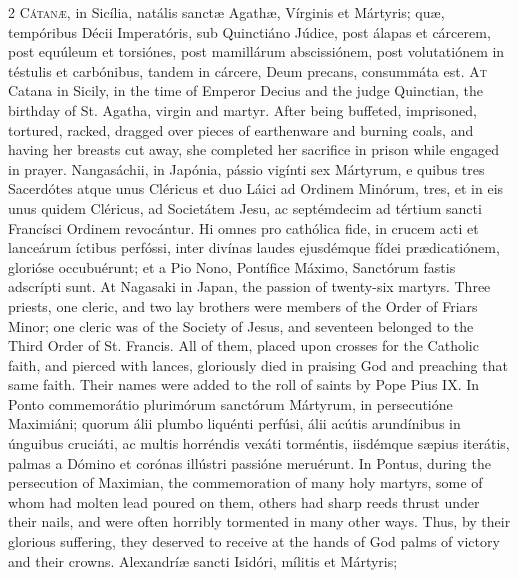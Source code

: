 \begin{paracol}{2}
\lettrine[lines=2]{C}{átanæ,} in Sicília, natális sanctæ Agathæ, 
 Vírginis et Mártyris; quæ, tempóribus Décii Imperatóris, sub Quinctiáno 
 Júdice, post álapas et cárcerem, post equúleum et torsiónes, post mamillárum 
 abscissiónem, post volutatiónem in téstulis et carbónibus, tandem in cárcere, 
 Deum precans, consummáta est.
\switchcolumn
{}
\lettrine[lines=2]{A}{t} Catana in Sicily, in the time of Emperor Decius and the judge Quinctian, 
 the birthday of St. Agatha, virgin and martyr. After being buffeted, 
 imprisoned, tortured, racked, dragged over pieces of earthenware and burning 
 coals, and having her breasts cut away, she completed her sacrifice in 
 prison while engaged in prayer.
\switchcolumn*
{}
Nangasáchii, in Japónia, pássio vigínti sex Mártyrum, e quibus tres 
 Sacerdótes atque unus Cléricus et duo Láici ad Ordinem Minórum, tres, et in 
 eis unus quidem Cléricus, ad Societátem Jesu, ac septémdecim ad tértium 
 sancti Francísci Ordinem revocántur. Hi omnes pro cathólica fide, in 
 crucem acti et lanceárum íctibus perfóssi, inter divínas laudes ejusdémque 
 fídei prædicatiónem, glorióse occubuérunt; et a 
 Pio Nono, Pontífice Máximo, Sanctórum fastis adscrípti sunt.
\switchcolumn
{}
At Nagasaki in Japan, the passion of twenty-six martyrs. Three 
 priests, one cleric, and two lay brothers were members of the Order of 
 Friars Minor; one cleric was of the Society of Jesus, and seventeen belonged 
 to the Third Order of St. Francis. All of them, placed upon crosses 
 for the Catholic faith, and pierced with lances, gloriously died in praising 
 God and preaching that same faith. Their names were added to the roll 
 of saints by Pope Pius IX.
\switchcolumn*
{}
In Ponto commemorátio plurimórum sanctórum Mártyrum, in persecutióne 
 Maximiáni; quorum álii plumbo liquénti perfúsi, álii acútis arundínibus in 
 únguibus cruciáti, ac multis horréndis vexáti torméntis, iisdémque sæpius 
 iterátis, palmas a Dómino et corónas illústri passióne meruérunt.
\switchcolumn
{}
In Pontus, during the persecution of Maximian, the commemoration of many 
 holy martyrs, some of whom had molten lead poured on them, others had sharp 
 reeds thrust under their nails, and were often horribly tormented in many 
 other ways. Thus, by their glorious suffering, they deserved to 
 receive at the hands of God palms of victory and their crowns.
\switchcolumn*
{}
Alexandríæ sancti Isidóri, mílitis et Mártyris; 

\end{paracol}
